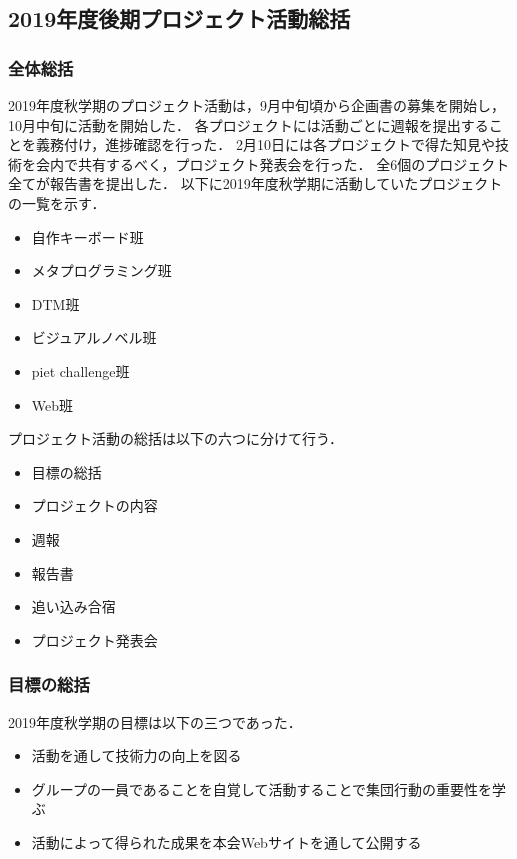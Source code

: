 \subsection*{2019年度後期プロジェクト活動総括}


\subsubsection*{全体総括}
2019年度秋学期のプロジェクト活動は，9月中旬頃から企画書の募集を開始し，10月中旬に活動を開始した．
各プロジェクトには活動ごとに週報を提出することを義務付け，進捗確認を行った．
2月10日には各プロジェクトで得た知見や技術を会内で共有するべく，プロジェクト発表会を行った．
全6個のプロジェクト全てが報告書を提出した．
以下に2019年度秋学期に活動していたプロジェクトの一覧を示す．

\begin{itemize}
\item 自作キーボード班
\item メタプログラミング班
\item DTM班
\item ビジュアルノベル班
\item piet challenge班
\item Web班
\end{itemize}

プロジェクト活動の総括は以下の六つに分けて行う．

\begin{itemize}
\item 目標の総括
\item プロジェクトの内容
\item 週報
\item 報告書
\item 追い込み合宿
\item プロジェクト発表会
\end{itemize}

\subsubsection*{目標の総括}
2019年度秋学期の目標は以下の三つであった．

\begin{itemize}
\item 活動を通して技術力の向上を図る
\item グループの一員であることを自覚して活動することで集団行動の重要性を学ぶ
\item 活動によって得られた成果を本会Webサイトを通して公開する
\end{itemize}

